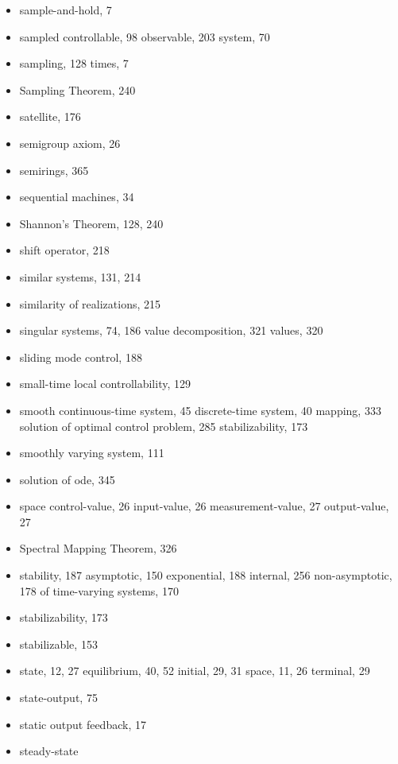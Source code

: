 \begin{itemize}
  \indexspace
  \item sample-and-hold, 7
  \item sampled
    \subitem controllable, 98
    \subitem observable, 203
    \subitem system, 70
  \item sampling, 128
    \subitem times, 7
  \item Sampling Theorem, 240
  \item satellite, 176
  \item semigroup axiom, 26
  \item semirings, 365
  \item sequential machines, 34
  \item Shannon's Theorem, 128, 240
  \item shift operator, 218
  \item similar systems, 131, 214
  \item similarity of realizations, 215
  \item singular
    \subitem systems, 74, 186
    \subitem value decomposition, 321
    \subitem values, 320
  \item sliding mode control, 188
  \item small-time local controllability, 129
  \item smooth
    \subitem continuous-time system, 45
    \subitem discrete-time system, 40
    \subitem mapping, 333
    \subitem solution of optimal control problem, 285
    \subitem stabilizability, 173
  \item smoothly varying system, 111
  \item solution of ode, 345
  \item space
    \subitem control-value, 26
    \subitem input-value, 26
    \subitem measurement-value, 27
    \subitem output-value, 27
  \item Spectral Mapping Theorem, 326
  \item stability, 187
    \subitem asymptotic, 150
    \subitem exponential, 188
    \subitem internal, 256
    \subitem non-asymptotic, 178
    \subitem of time-varying systems, 170
  \item stabilizability, 173
  \item stabilizable, 153
  \item state, 12, 27
    \subitem equilibrium, 40, 52
    \subitem initial, 29, 31
    \subitem space, 11, 26
    \subitem terminal, 29
  \item state-output, 75
  \item static output feedback, 17
  \item steady-state

\end{itemize}
